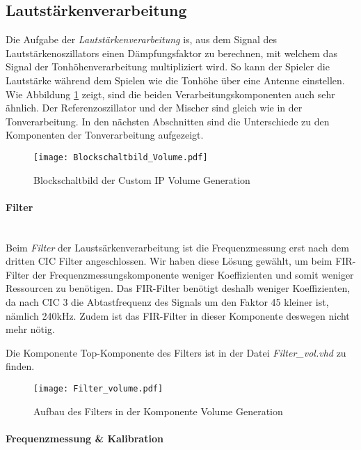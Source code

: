\subsection{Lautstärkenverarbeitung}\label{subsec:Volume_Generation}
Die Aufgabe der \textit{Lautstärkenverarbeitung} is, aus dem Signal des Lautstärkenoszillators einen Dämpfungsfaktor zu berechnen, mit welchem das Signal der Tonhöhenverarbeitung multipliziert wird. So kann der Spieler die Lautstärke während dem Spielen wie die Tonhöhe über eine Antenne einstellen. Wie Abbildung \ref{img:Blockschaltbild_volume} zeigt, sind die beiden Verarbeitungskomponenten auch sehr ähnlich. Der Referenzoszillator und der Mischer sind gleich wie in der Tonverarbeitung. In den nächsten Abschnitten sind die Unterschiede zu den Komponenten der Tonverarbeitung aufgezeigt.



\begin{figure}[h!]
	\centering
	\texttt{[image: Blockschaltbild\_Volume.pdf]}
	\caption{Blockschaltbild der Custom IP Volume Generation} 
	\label{img:Blockschaltbild_volume}
\end{figure}  


\newpage
\paragraph{Filter}\mbox{}\\

Beim \textit{Filter} der Laustsärkenverarbeitung ist die Frequenzmessung erst nach dem dritten CIC Filter angeschlossen. Wir haben diese Lösung gewählt, um beim FIR-Filter der Frequenzmessungskomponente weniger Koeffizienten und somit weniger Ressourcen zu benötigen. Das FIR-Filter benötigt deshalb weniger Koeffizienten, da nach CIC 3 die Abtastfrequenz des Signals um den Faktor 45 kleiner ist, nämlich 240kHz. Zudem ist das FIR-Filter in dieser Komponente deswegen nicht mehr nötig.

Die Komponente Top-Komponente des Filters ist in der Datei \textit{Filter\_vol.vhd} zu finden.

\begin{figure}[h!]
	\centering
	\texttt{[image: Filter\_volume.pdf]}
	\caption{Aufbau des Filters in der Komponente Volume Generation} 
	\label{img:Filter_Volume}
\end{figure}  

\paragraph{Frequenzmessung \& Kalibration}\mbox{}\\

